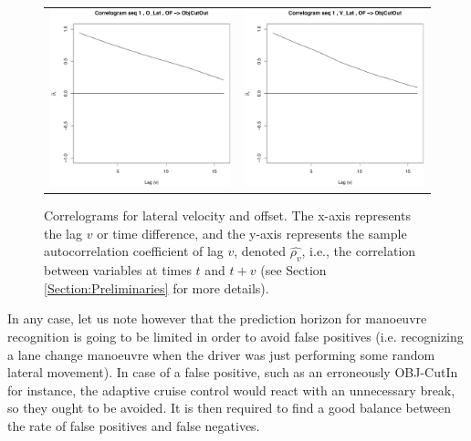 \begin{figure}
  \centering
    \begin{tabular}{cc}
    \includegraphics[width=60mm]{figures/DaimlerCorrOBJ_R15Offs.pdf}&
    \includegraphics[width=60mm]{figures/DaimlerCorrOBJ_R15Vel.pdf}\\
  \end{tabular}
    \caption{\label{Figure:daimlerCorrel}Correlograms for lateral velocity and offset. The x-axis represents the lag $v$ or time difference, and the y-axis represents the sample autocorrelation coefficient of lag $v$, denoted $\hat{\rho_v}$, i.e., the correlation between variables at times $t$ and $t+v$ (see Section \ref{Section:Preliminaries} for more details).}
\end{figure}

In any case, let us note however that the prediction horizon for manoeuvre recognition is going to be limited in order to avoid false positives (i.e. recognizing a lane change manoeuvre when the driver was just performing some random lateral movement).  In case of a false positive, such as an erroneously OBJ-CutIn for instance, the adaptive cruise control would react with an unnecessary break, so they ought to be avoided. It is then required to find a good balance between the rate of false positives and false negatives. 

